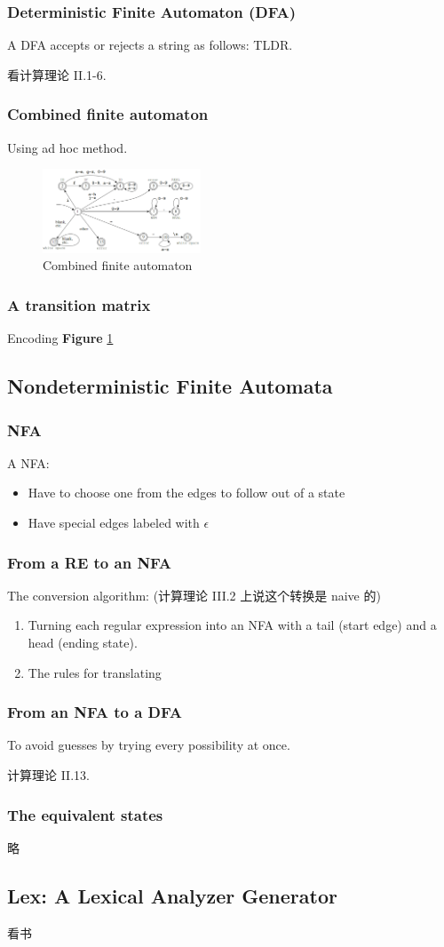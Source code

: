 \subsubsection{Deterministic Finite Automaton (DFA)}
A DFA accepts or rejects a string as follows: TLDR. 

看计算理论 II.1-6.

\subsubsection{Combined finite automaton}
Using ad hoc method.

\begin{figure}[!htb]
    \centering
    \includegraphics[width=0.42\textwidth]{pic/CP2/Combined finite automaton}
    \caption{Combined finite automaton}
    \label{fig:CDFA}
\end{figure}

\subsubsection{A transition matrix}
Encoding \textbf{Figure} \ref{fig:CDFA}

\subsection{Nondeterministic Finite Automata}
\subsubsection{NFA}
A NFA: 
\begin{itemize}
    \item Have to choose one from the edges to follow out of a state
    \item Have special edges labeled with $\epsilon$
\end{itemize}

\subsubsection{From a RE to an NFA}
The conversion algorithm: (计算理论 III.2 上说这个转换是 naive 的)
\begin{enumerate}
    \item Turning each regular expression into an NFA with a tail (start edge) and a head (ending state).
    \item The rules for translating
\end{enumerate}

\subsubsection{From an NFA to a DFA}
To avoid guesses by trying every possibility at once.

计算理论 II.13.

\subsubsection{The equivalent states}
略
\subsection{Lex: A Lexical Analyzer Generator}
看书